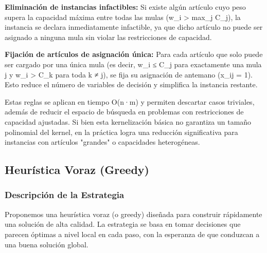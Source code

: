 \documentclass[12pt, a4paper]{article}
\begin{document}
    \textbf{Eliminación de instancias infactibles:} Si existe algún artículo cuyo peso supera la capacidad máxima entre todas las mulas (w_i > max_j C_j), la instancia se declara inmediatamente infactible, ya que dicho artículo no puede ser asignado a ninguna mula sin violar las restricciones de capacidad.

    \textbf{Fijación de artículos de asignación única:} Para cada artículo que solo puede ser cargado por una única mula (es decir, w_i ≤ C_j para exactamente una mula j y w_i > C_k para toda k ≠ j), se fija su asignación de antemano (x_ij = 1). Esto reduce el número de variables de decisión y simplifica la instancia restante.

    Estas reglas se aplican en tiempo O(n·m) y permiten descartar casos triviales, además de reducir el espacio de búsqueda en problemas con restricciones de capacidad ajustadas. Si bien esta kernelización básica no garantiza un tamaño polinomial del kernel, en la práctica logra una reducción significativa para instancias con artículos "grandes" o capacidades heterogéneas.

    \subsection{Heurística Voraz (Greedy)}
    \subsubsection{Descripción de la Estrategia}
    Proponemos una heurística voraz (o greedy) diseñada para construir rápidamente una solución de alta calidad. La estrategia se basa en tomar decisiones que parecen óptimas a nivel local en cada paso, con la esperanza de que conduzcan a una buena solución global.
\end{document}
